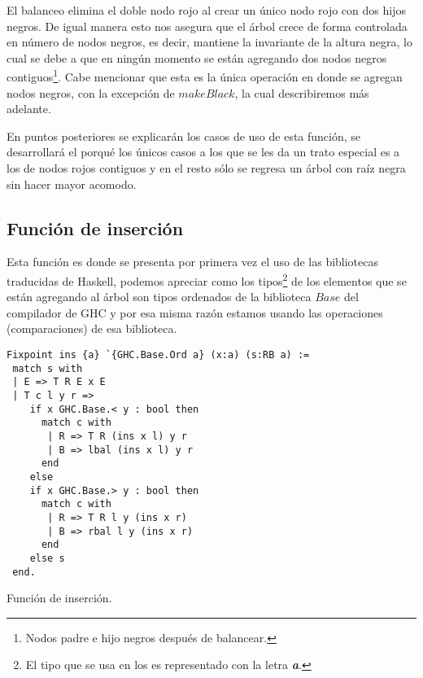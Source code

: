 El balanceo elimina el doble nodo rojo al crear un \'unico nodo rojo con dos hijos negros. De 
igual manera esto nos asegura que el árbol crece de forma controlada en n\'umero de nodos negros, es
decir, mantiene la invariante de la altura negra, lo cual se debe a que en ningún momento se están 
agregando dos nodos negros contiguos\footnote{Nodos padre e hijo negros después de balancear.}. Cabe
 mencionar que esta es la única operación en donde se agregan nodos negros, con la excepción de 
 \hyperref[raiz_negra_func]{$makeBlack$}, la cual describiremos m\'as adelante.

En puntos posteriores se explicar\'an los casos de uso de esta función, se desarrollar\'a el 
porqu\'e los \'unicos casos a los que se les da un trato especial es a los de nodos rojos contiguos
y en el resto s\'olo se regresa un \'arbol con ra\'iz negra sin hacer mayor acomodo.

\subsection {Funci\'on de inserci\'on}
Esta funci\'on es donde se presenta por primera vez el uso de las bibliotecas traducidas de
Haskell, podemos apreciar como los tipos\footnote{El tipo que se usa en los {\arns} es representado 
con la letra \textbf{\textit{a}}.} de los elementos que se est\'an agregando al \'arbol son tipos
ordenados de la biblioteca $Base$ del compilador de GHC y por esa misma raz\'on estamos usando las
operaciones (comparaciones) de esa biblioteca.

\begin{listing}[!ht]
\centering
\captionsetup{justification=centering}
\begin{verbatim}
Fixpoint ins {a} `{GHC.Base.Ord a} (x:a) (s:RB a) :=
 match s with
 | E => T R E x E
 | T c l y r =>
    if x GHC.Base.< y : bool then
      match c with
       | R => T R (ins x l) y r
       | B => lbal (ins x l) y r
      end
    else
    if x GHC.Base.> y : bool then
      match c with
       | R => T R l y (ins x r)
       | B => rbal l y (ins x r)
      end
    else s
 end.
\end{verbatim}
\caption{Funci\'on de inserci\'on.}
\label{func_ins}
\end{listing}

